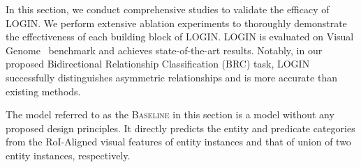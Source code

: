     \begin{table*}[t!]
        \captionsetup{font=footnotesize}
        \caption{
            \textbf{The SGG results on mean Recall (mR@K).} \textit{mR@k} denotes average \textit{R@K} over all predicate categories.
        }
        \centering
        \label{tab:mean_recall}
    \end{table*}
    
    In this section, we conduct comprehensive studies to validate the efficacy of LOGIN.
    We perform extensive ablation experiments to thoroughly demonstrate the effectiveness of each building block of LOGIN.
    LOGIN is evaluated on Visual Genome~\cite{krishna2017visual} benchmark and achieves state-of-the-art results.
    Notably, in our proposed Bidirectional Relationship Classification (BRC) task, LOGIN successfully distinguishes asymmetric relationships and is more accurate than existing methods.
    
    The model referred to as the \textsc{Baseline} in this section is a model without any proposed design principles. It directly predicts the entity and predicate categories from the RoI-Aligned visual features of entity instances and that of union of two entity instances, respectively.
    
